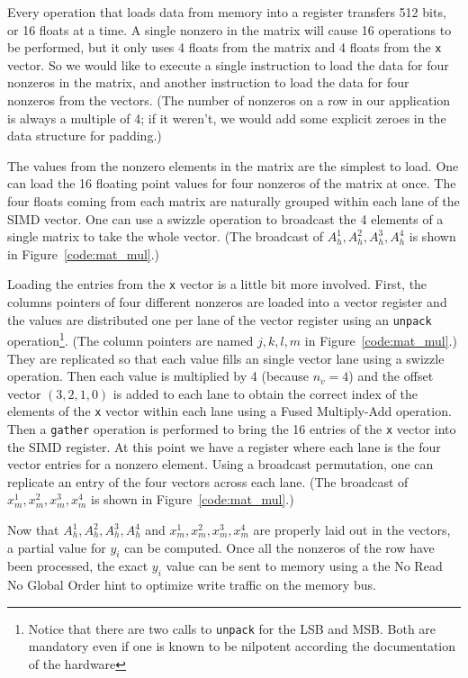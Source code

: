 \documentclass[10pt,conference,compsocconf]{IEEEtran}
\begin{document}
Every operation that loads data from memory into a register
transfers 512 bits, or 16 floats at a time. A single nonzero
in the matrix will cause 16 operations to be performed, but it only
uses 4 floats from the matrix and 4 floats from the {\tt x} vector. So
we would like to execute a single instruction to load the data for four 
nonzeros in the matrix, and another instruction to load the data for
four nonzeros from the vectors.  
(The number of nonzeros on a row in our application is
always a multiple of 4; if it weren't, we would add some explicit
zeroes in the data structure for padding.)

The values from the nonzero elements in the matrix are the simplest to
load. One can load the 16 floating point values for four nonzeros of
the matrix at once. The four floats coming from each matrix are
naturally grouped within each lane of the SIMD vector. One can use a
swizzle operation to broadcast the 4 elements of a single matrix to
take the whole vector. (The broadcast of $A_h^1,A_h^2,A_h^3,A_h^4$ is
shown in Figure~\ref{code:mat_mul}.)

Loading the entries from the {\tt x} vector is a little bit more
involved. First, the columns pointers of four different nonzeros are
loaded into a vector register and the values are distributed one per
lane of the vector register using an {\tt unpack}
operation\footnote{Notice that there are two calls to {\tt unpack} for the
  LSB and MSB. Both are mandatory even if one is known to be
  nilpotent according the documentation of the hardware}. (The column
pointers are named $j,k,l,m$ in Figure~\ref{code:mat_mul}.) They
are replicated so that each value fills an single vector lane 
using a swizzle operation. Then each value is multiplied by 4 
(because $n_v=4$) 
and the offset vector $(3,2,1,0)$ is added to each lane to obtain the
correct index of the elements of the {\tt x} vector within each lane
using a Fused Multiply-Add operation. Then a {\tt gather} operation is
performed to bring the 16 entries of the {\tt x} vector into the SIMD
register. At this point we have a register where each lane is the
four vector entries for a nonzero element. Using a broadcast
permutation, one can replicate an entry of the four vectors across
each lane. (The broadcast of $x_m^1,x_m^2,x_m^3,x_m^4$ is shown in
Figure~\ref{code:mat_mul}.)

Now that $A_h^1,A_h^2,A_h^3,A_h^4$ and $x_m^1,x_m^2,x_m^3,x_m^4$ are
properly laid out in the vectors, a partial value for $y_i$ can be
computed. Once all the nonzeros of the row have been processed, the
exact $y_i$ value can be sent to memory using a the No Read No Global
Order hint to optimize write traffic on the memory bus.
\end{document}

